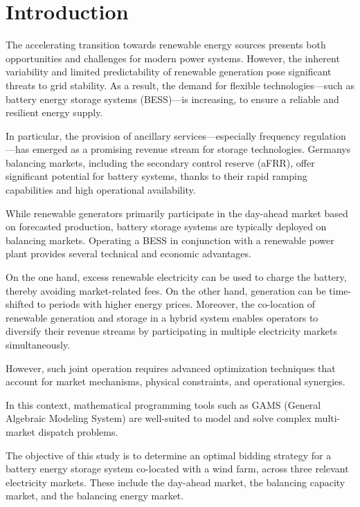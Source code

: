 \chapter{Introduction}

The accelerating transition towards renewable energy sources presents both opportunities
and challenges for modern power systems. However, the inherent variability and limited
predictability of renewable generation pose significant threats to grid stability.
As a result, the demand for flexible technologies—such as battery energy storage systems (BESS)—is increasing,
to ensure a reliable and resilient energy supply.

In particular, the provision of ancillary services—especially frequency regulation—has emerged
as a promising revenue stream for storage technologies. Germany\textquotesingle s balancing markets,
including the secondary control reserve (aFRR), offer significant potential for battery systems,
thanks to their rapid ramping capabilities and high operational availability.

While renewable generators primarily participate in the day-ahead market based on
forecasted production, battery storage systems are typically deployed on balancing markets.
Operating a BESS in conjunction with a renewable power plant provides several technical and economic advantages.

On the one hand, excess renewable electricity can be used to charge the battery, thereby
avoiding market-related fees. On the other hand, generation can be time-shifted to periods
with higher energy prices. Moreover, the co-location of renewable generation and storage in a hybrid system
enables operators to diversify their revenue streams by participating in multiple electricity markets simultaneously.


However, such joint operation requires advanced optimization techniques that account for market
mechanisms, physical constraints, and operational synergies.

In this context, mathematical programming tools such as GAMS (General Algebraic Modeling System)
are well-suited to model and solve complex multi-market dispatch problems.

The objective of this study is to determine an optimal bidding strategy for a battery energy storage system
co-located with a wind farm, across three relevant electricity markets. These include the day-ahead market,
the balancing capacity market, and the balancing energy market.

